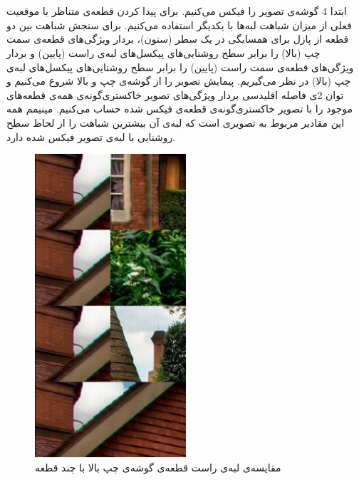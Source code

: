 \documentclass{article}
\begin{document}
\subsection{}


\section{}%

\section{}%
\subsection{}
ابتدا 4 گوشه‌ی تصویر را فیکس می‌کنیم. برای پیدا کردن قطعه‌ی متناظر با موقعیت فعلی از میزان شباهت لبه‌ها با یکدیگر استفاده می‌کنیم. برای سنجش شباهت بین دو قطعه از پازل برای همسایگی در یک سطر (ستون)، بردار ویژگی‌های قطعه‌ی سمت چپ (بالا) را برابر سطح روشنایی‌های پیکسل‌های لبه‌ی راست (پایین) و بردار ویژگی‌های قطعه‌ی سمت راست (پایین) را برابر سطح روشنایی‌های پیکسل‌های لبه‌ی چپ (بالا) در نظر می‌گیریم. پیمایش تصویر را از گوشه‌ی چپ و بالا شروع می‌کنیم و توان 2ی فاصله اقلیدسی بردار ویژگی‌های تصویر خاکستری‌گونه‌ی همه‌ی قطعه‌های موجود را با تصویر خاکستری‌گونه‌ی قطعه‌ی فیکس شده حساب می‌کنیم. مینیمم همه این مقادیر مربوط به تصویری است که لبه‌ی آن بیشترین شباهت را از لحاظ سطح روشنایی با لبه‌ی تصویر فیکس شده دارد.
\begin{figure}[H]
    \centering
    \includegraphics[width=0.5\textwidth]{figures/1p3.jpg}
    \caption
	{
مقایسه‌ی لبه‌ی راست قطعه‌ی گوشه‌ی چپ بالا با چند قطعه
	}
    \label{fig:fig1}
\end{figure}
\end{document}
